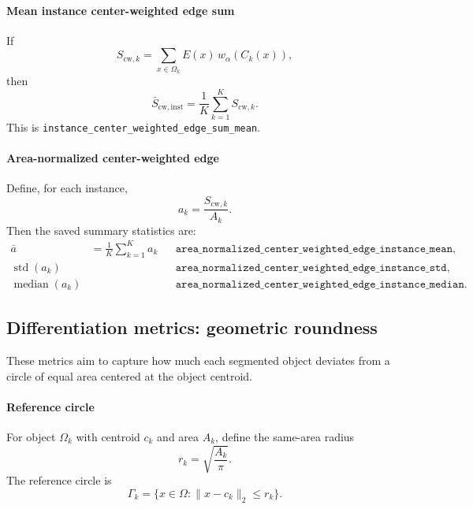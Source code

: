 \documentclass[11pt]{article}
\newcommand{\1}{\mathbf{1}}
\newcommand{\std}{\operatorname{std}}
\newcommand{\edgefield}{E}
\begin{document}
\paragraph{Mean instance center-weighted edge sum}
If
\begin{equation}
S_{\mathrm{cw},k}=\sum_{x\in\Omega_k} \edgefield(x)\,w_{\alpha}(C_k(x)),
\end{equation}
then
\begin{equation}
\bar{S}_{\mathrm{cw,inst}} = \frac{1}{K}\sum_{k=1}^{K} S_{\mathrm{cw},k}.
\end{equation}
This is \texttt{instance\_center\_weighted\_edge\_sum\_mean}.

\paragraph{Area-normalized center-weighted edge}
Define, for each instance,
\begin{equation}
a_k = \frac{S_{\mathrm{cw},k}}{A_k}.
\end{equation}
Then the saved summary statistics are:
\begin{align}
\bar{a} &= \frac{1}{K}\sum_{k=1}^{K} a_k && \texttt{area\_normalized\_center\_weighted\_edge\_instance\_mean},\\
\std(a_k) &&& \texttt{area\_normalized\_center\_weighted\_edge\_instance\_std},\\
\operatorname{median}(a_k) &&& \texttt{area\_normalized\_center\_weighted\_edge\_instance\_median}.
\end{align}

\subsection{Differentiation metrics: geometric roundness}
These metrics aim to capture how much each segmented object deviates from a circle of equal area centered at the object centroid.

\paragraph{Reference circle}
For object $\Omega_k$ with centroid $c_k$ and area $A_k$, define the same-area radius
\begin{equation}
r_k = \sqrt{\frac{A_k}{\pi}}.
\end{equation}
The reference circle is
\begin{equation}
\Gamma_k = \{x\in\Omega : \|x-c_k\|_2 \le r_k\}.
\end{equation}
\end{document}
